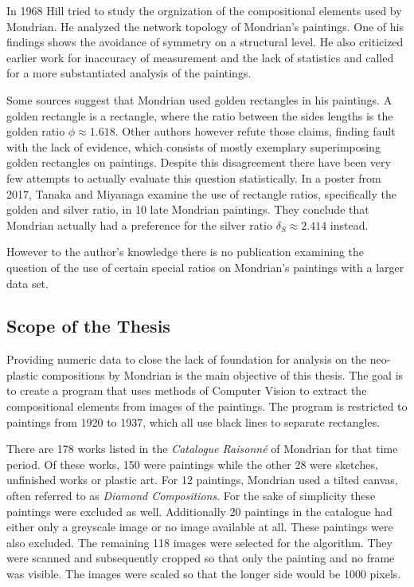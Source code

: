 \documentclass[serif,article,noparskip]{agse-thesis}
\begin{document}
In 1968 Hill \cite{Hill1968} tried to study the orgnization of the compositional
elements used by Mondrian. He analyzed the network topology of Mondrian's
paintings. One of his findings shows the avoidance of symmetry on a structural
level. He also criticized earlier work for inaccuracy of measurement and the
lack of statistics and called for a more substantiated analysis of the
paintings.

Some sources \cite{bouleau1963,bergamini1980} suggest that Mondrian used golden
rectangles in his paintings. A golden rectangle is a rectangle, where the ratio
between the sides lengths is the golden ratio $\phi \approx 1.618$. Other authors
 \cite{Livio2002,Markowsky1992} however refute those claims, finding fault with
the lack of evidence, which consists of mostly exemplary superimposing golden
rectangles on paintings. Despite this disagreement there have been very few
attempts to actually evaluate this question statistically. In a poster from
2017, Tanaka and Miyanaga \cite{Tanaka2017} examine the use of rectangle ratios,
specifically the golden and silver ratio, in 10 late Mondrian paintings. They
conclude that Mondrian actually had a preference for the silver ratio $\delta_S
\approx 2.414$ instead.

However to the author's knowledge there is no publication examining the question of
the use of certain special ratios on Mondrian's paintings with a larger data
set.

\subsection{Scope of the Thesis}

Providing numeric data to close the lack of foundation for analysis on the
neo-plastic compositions by Mondrian is the main objective of this thesis. The
goal is to create a program that uses methods of Computer Vision to extract the
compositional elements from images of the paintings. The program is restricted
to paintings from 1920 to 1937, which all use black lines to separate rectangles.

There are 178 works listed in the \textit{Catalogue Raisonn{\'e}}
\cite{joosten1998} of Mondrian for that time period. Of these works, 150 were
paintings while the other 28 were sketches, unfinished works or plastic art. For
12 paintings, Mondrian used a tilted canvas, often referred to as
\textit{Diamond Compositions}. For the sake of simplicity these paintings were
excluded as well. Additionally 20 paintings in the catalogue had either only a
greyscale image or no image available at all. These paintings were also
excluded. The remaining 118 images were selected for the algorithm. They were
scanned and subsequently cropped so that only the painting and no frame was
visible. The images were scaled so that the longer side would be 1000 pixels.
\end{document}
